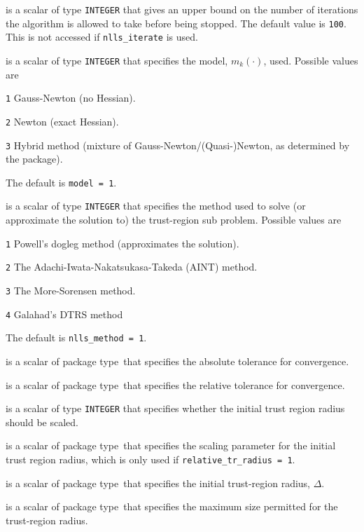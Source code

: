 \documentclass{spec}
\newcommand{\scalarinteger}{is a scalar of type {\tt INTEGER} }
\newcommand{\scalarreal}{is a scalar of package type\ }
\begin{document}
\begin{description}

 \scalarinteger that gives an upper bound on the number
of iterations the algorithm is allowed to take before being stopped.  The default value is {\tt 100}.  This is not accessed if {\tt nlls\_iterate} is used.

 \scalarinteger that specifies the model, $m_k(\cdot)$, used.  Possible values are
\begin{description}
  \item{\tt 1} Gauss-Newton (no Hessian).
  \item{\tt 2} Newton (exact Hessian).
  \item{\tt 3} Hybrid method (mixture of Gauss-Newton/(Quasi-)Newton, as determined by the package).
\end{description}
The default is {\tt model = 1}.

 \scalarinteger that specifies the method used to solve
(or approximate the solution to) the trust-region sub problem.  Possible values are
\begin{description}
  \item{\tt 1} Powell's dogleg method (approximates the solution).
  \item{\tt 2} The Adachi-Iwata-Nakatsukasa-Takeda (AINT) method.
  \item{\tt 3} The More-Sorensen method.
  \item{\tt 4} {\sc Galahad}'s {\sc DTRS} method
\end{description}
The default is {\tt nlls\_method = 1}.

 \scalarreal that specifies the absolute tolerance for convergence.

 \scalarreal that specifies the relative tolerance for convergence.

 \scalarinteger that specifies whether the initial trust region
radius should be scaled.

 \scalarreal that specifies the scaling parameter for the initial trust region radius, which is only used if {\tt relative\_tr\_radius = 1}.

 \scalarreal that specifies the initial trust-region radius, $\Delta$.

 \scalarreal that specifies the maximum size permitted for the trust-region radius.


\end{description}
\end{document}

